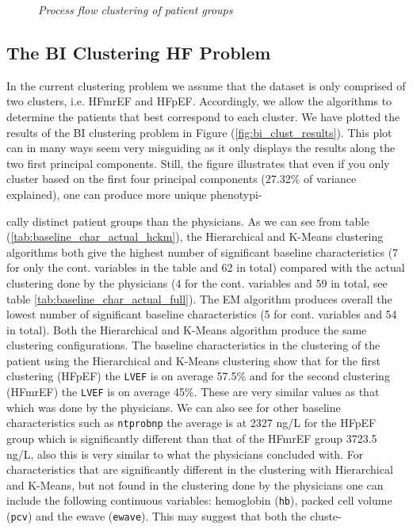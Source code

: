 \documentclass[../thesis.tex]{subfiles}
\begin{document}
\begin{figure}
    \centering
    
    \caption[Process flow clustering of patient groups]{\textit{Process flow clustering of patient groups}}
    \label{fig:process_flow_clustering}
\end{figure}

\subsection{The BI Clustering HF Problem}
\label{subsec:bi_clust}

In the current clustering problem we assume that the dataset is only comprised of two clusters, i.e. HFmrEF and HFpEF. Accordingly, we allow the algorithms to determine the patients that best correspond to each cluster. We have plotted the results of the BI clustering problem in Figure (\ref{fig:bi_clust_results}). This plot can in many ways seem very misguiding as it only displays the results along the two first principal components. Still, the figure illustrates that even if you only cluster based on the first four principal components (27.32\% of variance explained), one can produce more unique phenotypi-     





\noindent cally distinct patient groups than the physicians. As we can see from table (\ref{tab:baseline_char_actual_hckm}), the  Hierarchical and K-Means clustering algorithms both give the highest number of significant baseline characteristics (7 for only the cont. variables in the table and 62 in total) compared with the actual clustering done by the physicians (4 for the cont. variables and 59 in total, see table \ref{tab:baseline_char_actual_full}). The EM algorithm produces overall the lowest number of significant baseline characteristics (5 for cont. variables and 54 in total). Both the Hierarchical and K-Means algorithm produce the same clustering configurations. The baseline characteristics in the clustering of the patient using the Hierarchical and K-Means clustering show that for the first clustering (HFpEF) the \texttt{LVEF} is on average 57.5\% and for the second clustering (HFmrEF) the \texttt{LVEF} is on average 45\%. These are very similar values as that which was done by the physicians. We can also see for other baseline characteristics such as \texttt{ntprobnp} the average is at 2327 ng/L for the HFpEF group which is significantly different than that of the HFmrEF group 3723.5 ng/L, also this is very similar to what the physicians concluded with. For characteristics that are significantly different in the clustering with Hierarchical and K-Means, but not found in the clustering done by the physicians one can include the following continuous variables: hemoglobin (\texttt{hb}), packed cell volume (\texttt{pcv}) and the ewave (\texttt{ewave}). This may suggest that both the cluste-    
\end{document}
